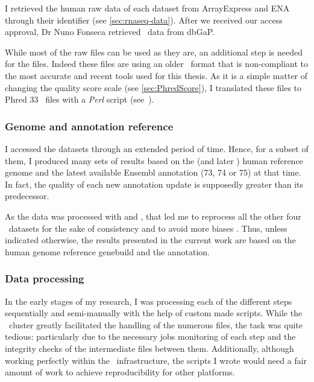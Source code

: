 I retrieved the human raw data of each dataset from \gls{ArrayExpress} and
\gls{ENA} through their identifier (see \cref{sec:rnaseq-data}). After we
received our access approval, Dr Nuno Fonseca retrieved \Gtex\ data from
\gls{dbGaP}.

While most of the raw files can be used as they are, an additional step is
needed for the  files. Indeed these files are using an older
\fastq\ format that is non-compliant to the most accurate and recent tools used
for this thesis.
As it is a simple matter of changing the quality score scale
(see \cref{sec:PhredScore}),
I translated these files to \gls{Phred} $33$ \fastq\ files with a
\emph{\gls{Perl}} script (see~).

\subsubsection{Genome and annotation reference}

I accessed the datasets through an extended period of time. Hence, for a subset of
them, I produced many sets of results based on the 
(and later ) human reference genome and the latest available
\gls{Ensembl} annotation (73, 74 or 75) at that time.
In fact, the quality of each new annotation update is
supposedly greater than its predecessor.

As the  data was processed with  and , that led me
to reprocess all the other four \Rnaseq\ datasets for the sake of consistency and
to avoid more biases . Thus, unless indicated
otherwise, the results presented in the current work are
based on the  human genome reference genebuild and the 
annotation.


\subsubsection{Data processing}

In the early stages of my research, I was processing each of the different steps
sequentially and semi-manually with the help of custom made scripts. While the
\EBI\ \gls{cluster} greatly facilitated the handling of the numerous files,
the task was quite tedious: particularly due to the necessary jobs monitoring of
each step and the integrity checks of the intermediate files between them.
Additionally, although working perfectly within the \EBI\ infrastructure,
the scripts I wrote would need a fair amount of work to achieve reproducibility
for other platforms.

